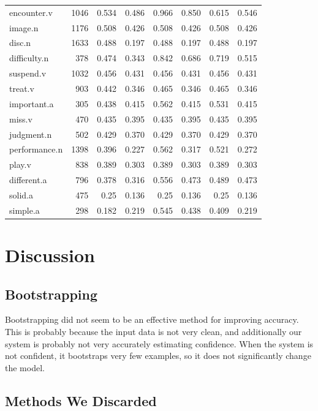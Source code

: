\documentclass{article}
\begin{document}
\begin{longtable}{l | r r r r r r r}
encounter.v    	&	1046	&	0.534	&	0.486	&	0.966	&	0.850	&	0.615	&	0.546\\
image.n     	&	1176	&	0.508	&	0.426	&	0.508	&	0.426	&	0.508	&	0.426\\
disc.n      	&	1633	&	0.488	&	0.197	&	0.488	&	0.197	&	0.488	&	0.197\\
difficulty.n	&	378 	&	0.474	&	0.343	&	0.842	&	0.686	&	0.719	&	0.515\\
suspend.v    	&	1032	&	0.456	&	0.431	&	0.456	&	0.431	&	0.456	&	0.431\\
treat.v        	&	903 	&	0.442	&	0.346	&	0.465	&	0.346	&	0.465	&	0.346\\
important.a    	&	305 	&	0.438	&	0.415	&	0.562	&	0.415	&	0.531	&	0.415\\
miss.v        	&	470 	&	0.435	&	0.395	&	0.435	&	0.395	&	0.435	&	0.395\\
judgment.n    	&	502 	&	0.429	&	0.370	&	0.429	&	0.370	&	0.429	&	0.370\\
performance.n	&	1398	&	0.396	&	0.227	&	0.562	&	0.317	&	0.521	&	0.272\\
play.v        	&	838 	&	0.389	&	0.303	&	0.389	&	0.303	&	0.389	&	0.303\\
different.a    	&	796 	&	0.378	&	0.316	&	0.556	&	0.473	&	0.489	&	0.473\\
solid.a        	&	475 	&	0.25	&	0.136	&	0.25	&	0.136	&	0.25	&	0.136\\
simple.a    	&	298 	&	0.182	&	0.219	&	0.545	&	0.438	&	0.409	&	0.219\\

\end{longtable}

\section{Discussion}

\subsection{Bootstrapping}

Bootstrapping did not seem to be an effective method for improving accuracy.  This is probably because the input data is not very clean, and additionally our system is probably not very accurately estimating confidence.  When the system is not confident, it bootstraps very few examples, so it does not significantly change the model.

\subsection{Methods We Discarded}
\end{document}
